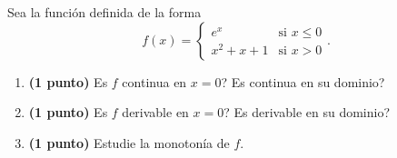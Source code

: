 
Sea la función definida de la forma
\[
f(x)=\begin{cases}
e^x&\text{si }x\leq0\\[0.4em]
x^2+x+1&\text{si }x>0
\end{cases}.
\]
\begin{enumerate}[label=\alph*)]
\item \textbf{(1 punto)} \textquestiondown{}Es $f$ continua en $x=0$? \textquestiondown{}Es continua en su dominio?
\item \textbf{(1 punto)} \textquestiondown{}Es $f$ derivable en $x=0$? \textquestiondown{}Es derivable en su dominio?
\item \textbf{(1 punto)} Estudie la monotonía de $f$.
\end{enumerate}
